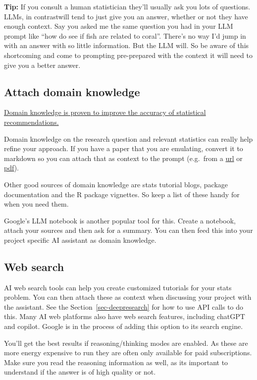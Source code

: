 \documentclass[
  letterpaper,
  DIV=11,
  numbers=noendperiod]{scrreprt}
\begin{document}
\textbf{Tip:} If you consult a human statistician they'll usually ask
you lots of questions. LLMs, in contrastwill tend to just give you an
answer, whether or not they have enough context. Say you asked me the
same question you had in your LLM prompt like ``how do see if fish are
related to coral''. There's no way I'd jump in with an answer with so
little information. But the LLM will. So be aware of this shortcoming
and come to prompting pre-prepared with the context it will need to give
you a better answer.

\subsection{Attach domain knowledge}\label{attach-domain-knowledge}

\href{TODO\%20add\%20link}{Domain knowledge is proven to improve the
accuracy of statistical recommendations.}

Domain knowledge on the research question and relevant statistics can
really help refine your approach. If you have a paper that you are
emulating, convert it to markdown so you can attach that as context to
the prompt (e.g.~from a
\href{https://tools.simonwillison.net/jina-reader}{url} or
\href{TODO\%20add\%20link}{pdf}).

Other good sources of domain knowledge are stats tutorial blogs, package
documentation and the R package vignettes. So keep a list of these handy
for when you need them.

Google's LLM notebook is another popular tool for this. Create a
notebook, attach your sources and then ask for a summary. You can then
feed this into your project specific AI assistant as domain knowledge.

\subsection{Web search}\label{web-search}

AI web search tools can help you create customized tutorials for your
stats problem. You can then attach these as context when discussing your
project with the assistant. See the Section~\ref{sec-deepresearch} for
how to use API calls to do this. Many AI web platforms also have web
search features, including chatGPT and copilot. Google is in the process
of adding this option to its search engine.

You'll get the best results if reasoning/thinking modes are enabled. As
these are more energy expensive to run they are often only available for
paid subscriptions. Make sure you read the reasoning information as
well, as its important to understand if the answer is of high quality or
not.
\end{document}

